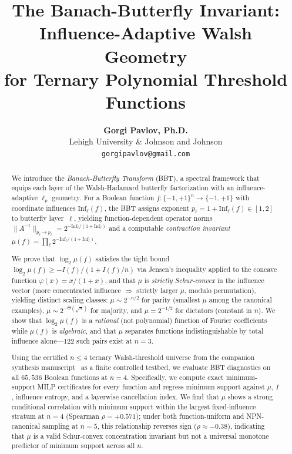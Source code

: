 \documentclass[11pt]{article}
\title{The Banach-Butterfly Invariant: Influence-Adaptive Walsh Geometry\\for Ternary Polynomial Threshold Functions}
\author{
  \textbf{Gorgi Pavlov, Ph.D.} \\
  Lehigh University \& Johnson and Johnson \\
  \texttt{gorgipavlov@gmail.com}
}
\newcommand{\Inf}{\mathrm{Inf}}
\begin{document}
\maketitle

\begin{abstract}
We introduce the \emph{Banach-Butterfly Transform} (BBT), a spectral framework that equips each layer of the Walsh-Hadamard butterfly factorization with an influence-adaptive $\ell_p$ geometry.
For a Boolean function $f:\{-1,+1\}^n \to \{-1,+1\}$ with coordinate influences $\Inf_\ell(f)$, the BBT assigns exponent $p_\ell = 1 + \Inf_\ell(f) \in [1,2]$ to butterfly layer~$\ell$, yielding function-dependent operator norms $\|A^{-1}\|_{p_\ell \to p_\ell} = 2^{-\Inf_\ell/(1+\Inf_\ell)}$ and a computable \emph{contraction invariant} $\mu(f) = \prod_\ell 2^{-\Inf_\ell/(1+\Inf_\ell)}$.

We prove that $\log_2 \mu(f)$ satisfies the tight bound $\log_2 \mu(f) \ge -I(f)/(1 + I(f)/n)$ via Jensen's inequality applied to the concave function $\varphi(x)=x/(1+x)$, and that $\mu$ is \emph{strictly Schur-convex} in the influence vector (more concentrated influence $\Rightarrow$ strictly larger $\mu$, modulo permutation), yielding distinct scaling classes: $\mu \sim 2^{-n/2}$ for parity (smallest $\mu$ among the canonical examples), $\mu \sim 2^{-\Theta(\sqrt{n})}$ for majority, and $\mu = 2^{-1/2}$ for dictators (constant in $n$). We show that $\log_2 \mu(f)$ is a \emph{rational} (not polynomial) function of Fourier coefficients while $\mu(f)$ is \emph{algebraic}, and that $\mu$ separates functions indistinguishable by total influence alone---122 such pairs exist at $n=3$.

Using the certified $n \le 4$ ternary Walsh-threshold universe from the companion synthesis manuscript~\cite{spectralSynthesisCompanion} as a finite controlled testbed, we evaluate BBT diagnostics on all $65{,}536$ Boolean functions at $n=4$. Specifically, we compute exact minimum-support MILP certificates for every function and regress minimum support against $\mu$, $I$, influence entropy, and a layerwise cancellation index. We find that $\mu$ shows a strong conditional correlation with minimum support within the largest fixed-influence stratum at $n=4$ (Spearman $\rho = +0.571$); under both function-uniform and NPN-canonical sampling at $n=5$, this relationship reverses sign ($\rho \approx -0.38$), indicating that $\mu$ is a valid Schur-convex concentration invariant but not a universal monotone predictor of minimum support across all $n$.


\end{abstract}
\end{document}
